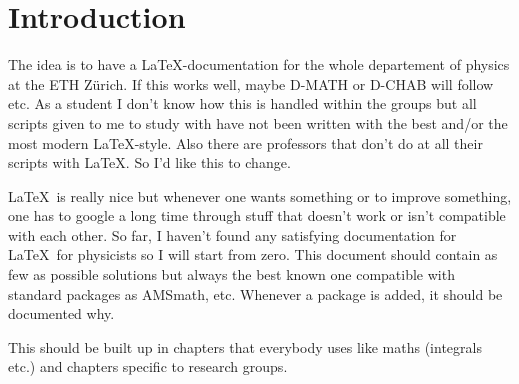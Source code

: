 \chapter*{Introduction}
The idea is to have a \LaTeX-documentation for the whole departement of physics at the ETH Zürich. If this works well, maybe D-MATH or D-CHAB will follow etc. As a student I don't know how this is handled within the groups but all scripts given to me to study with have not been written with the best and/or the most modern \LaTeX-style. Also there are professors that don't do at all their scripts with \LaTeX. So I'd like this to change.

\LaTeX ~is really nice but whenever one wants something or to improve something, one has to google a long time through stuff that doesn't work or isn't compatible with each other. So far, I haven't found any satisfying documentation for \LaTeX ~for physicists so I will start from zero. This document should contain as few as possible solutions but always the best known one compatible with standard packages as AMSmath, etc. Whenever a package is added, it should be documented why.

This should be built up in chapters that everybody uses like maths (integrals etc.) and chapters specific to research groups.
